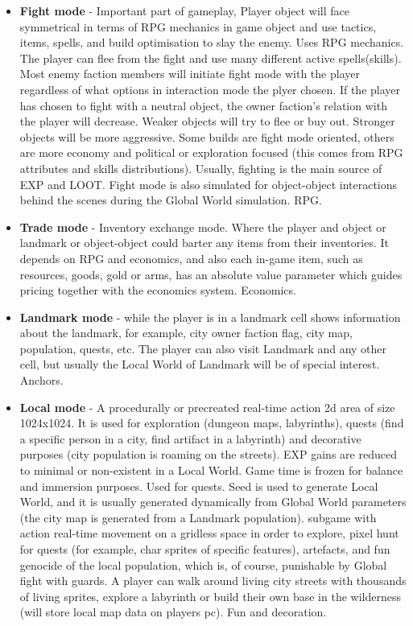 \begin{itemize}
 \item \textbf{Fight mode} - Important part of gameplay, Player object will face symmetrical in terms of RPG mechanics in game object and use tactics, items, spells, and build optimisation to slay the enemy. Uses RPG mechanics. The player can flee from the fight and use many different active spells(skills). Most enemy faction members will initiate fight mode with the player regardless of what options in interaction mode the plyer chosen. If the player has chosen to fight with a neutral object, the owner faction's relation with the player will decrease. Weaker objects will try to flee or buy out. Stronger objects will be more aggressive. Some builds are fight mode oriented, others are more economy and political or exploration focused (this comes from RPG attributes and skills distributions). Usually, fighting is the main source of EXP and LOOT. Fight mode is also simulated for object-object interactions behind the scenes during the Global World simulation. RPG.
 
 \item \textbf{Trade mode} - Inventory exchange mode. Where the player and object or landmark or object-object could barter any items from their inventories. It depends on RPG and economics, and also each in-game item, such as resources, goods, gold or arms, has an absolute value parameter which guides pricing together with the economics system. Economics.
 
 \item \textbf{Landmark mode} - while the player is in a landmark cell shows information about the landmark, for example, city owner faction flag, city map, population, quests, etc. The player can also visit Landmark and any other cell, but usually the Local World of Landmark will be of special interest. Anchors. 
 
 \item \textbf{Local mode} - A procedurally or precreated real-time action 2d area of size 1024x1024. It is used for exploration (dungeon maps, labyrinths), quests (find a specific person in a city, find artifact in a labyrinth) and decorative purposes (city population is roaming on the streets). EXP gains are reduced to minimal or non-existent in a Local World. Game time is frozen for balance and immersion purposes. Used for quests. Seed is used to generate Local World, and it is usually generated dynamically from Global World parameters (the city map is generated from a Landmark population).
 subgame with action real-time movement on a gridless space in order to explore, pixel hunt for quests (for example, char sprites of specific features), artefacts, and fun genocide of the local population, which is, of course, punishable by Global fight with guards. A player can walk around living city streets with thousands of living sprites, explore a labyrinth or build their own base in the wilderness (will store local map data on players pc).  Fun and decoration.
 

\end{itemize}
